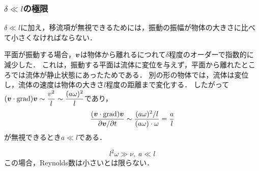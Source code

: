 \subsubsection*{$\delta \ll l$の極限}
$\delta \ll l$に加え，移流項が無視できるためには，振動の振幅が物体の大きさに比べて小さくなければならない．
\begin{details}
平面が振動する場合，$\vb*{v}$は物体から離れるにつれて$\delta$程度のオーダーで指数的に減少した．
これは，振動する平面は流体に変位を与えず，平面から離れたところでは流体が静止状態にあったためである．
別の形の物体では，流体は変位し，流体の速度は物体の大きさ$l$程度の距離まで変化する．
したがって$(\vb*{v}\cdot\operatorname{grad})\vb*{v} \sim \dfrac{v^2}{l} \sim \dfrac{(a\omega)^2}{l}$であり，
\[
    \frac{(\vb*{v}\cdot\operatorname{grad})\vb*{v}}{\partial\vb*{v}/\partial t} \sim \frac{(a\omega)^2/l}{(a\omega)\cdot\omega} = \frac{a}{l}
\]
が無視できるとき$a\ll l$である．
\end{details}

\begin{equation}\label{eq24.11:δ<<lで移流項が無視できる条件}
    l^2 \omega \gg \nu, \; a \ll l
\end{equation}
この場合，Reynolds数は小さいとは限らない．




